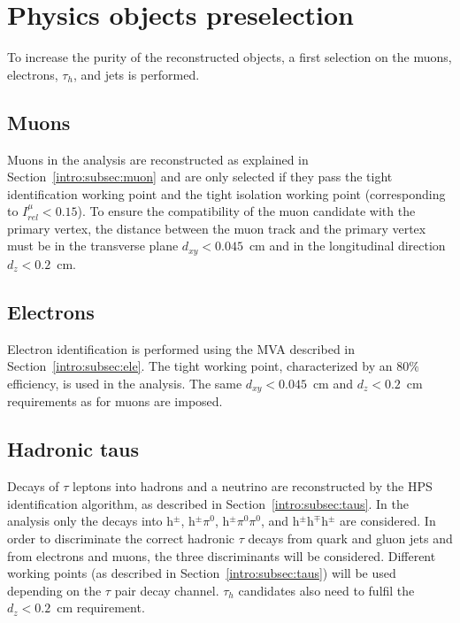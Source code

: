 \documentclass[../main.tex]{subfiles}
\begin{document}
\section{Physics objects preselection}
\label{hh:sec:objects}

To increase the purity of the reconstructed objects, a first selection on the muons, electrons, $\tau_h$, and jets is performed.

\subsection{Muons}
\label{hh:subsec:muons}

Muons in the analysis are reconstructed as explained in Section~\ref{intro:subsec:muon} and are only selected if they pass the tight identification working point and the tight isolation working point (corresponding to $I^\mu_{rel}<0.15$). To ensure the compatibility of the muon candidate with the primary vertex, the distance between the muon track and the primary vertex must be in the transverse plane $d_{xy}<0.045$~cm  and in the longitudinal direction $d_z<0.2$~cm.

\subsection{Electrons}
\label{hh:subsec:electrons}

Electron identification is performed using the MVA described in Section~\ref{intro:subsec:ele}. The tight working point, characterized by an 80$\%$ efficiency, is used in the analysis. The same $d_{xy}<0.045$~cm and $d_z<0.2$~cm requirements as for muons are imposed.

\subsection{Hadronic taus}
\label{hh:subsec:taus}

Decays of $\tau$ leptons into hadrons and a neutrino are reconstructed by the HPS identification algorithm, as described in Section~\ref{intro:subsec:taus}. In the analysis only the decays into h${}^\pm$,  h${}^\pm \pi^0$, h${}^\pm\pi^0\pi^0$, and h${}^\pm$h${}^\mp$h${}^\pm$ are considered. In order to discriminate the correct hadronic $\tau$ decays from quark and gluon jets and from electrons and muons, the three \deeptau{} discriminants will be considered. Different working points (as described in Section~\ref{intro:subsec:taus}) will be used depending on the $\tau$ pair decay channel. $\tau_h$ candidates also need to fulfil the $d_z<0.2$~cm requirement.
\end{document}
